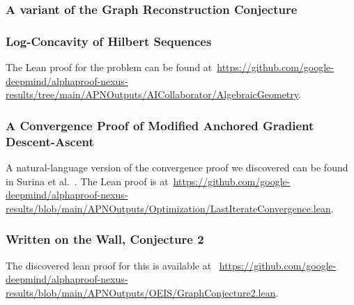 \subsubsection*{A variant of the Graph Reconstruction Conjecture}


\subsubsection*{Log-Concavity of Hilbert Sequences}


The Lean proof for the problem can be found at~\url{https://github.com/google-deepmind/alphaproof-nexus-results/tree/main/APNOutputs/AICollaborator/AlgebraicGeometry}.

\subsubsection*{A Convergence Proof of Modified Anchored Gradient Descent-Ascent}
% 
A natural-language version of the convergence proof we discovered can be found in Surina et al.~\cite{surina2026improvedlastiterateconvergencerate}.
The Lean proof is at~\url{https://github.com/google-deepmind/alphaproof-nexus-results/blob/main/APNOutputs/Optimization/LastIterateConvergence.lean}.

\subsubsection*{Written on the Wall, Conjecture 2}


The discovered lean proof for this is available at ~\url{https://github.com/google-deepmind/alphaproof-nexus-results/blob/main/APNOutputs/OEIS/GraphConjecture2.lean}.



